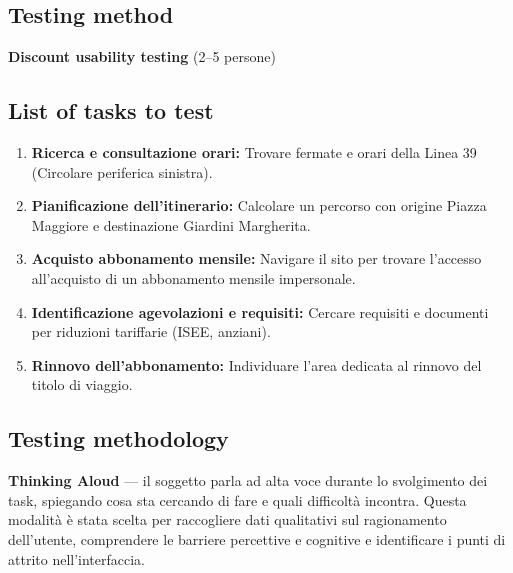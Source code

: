 ﻿\documentclass[11pt,a4paper]{article}
\begin{document}
\vspace{0.2cm}

\subsection*{Testing method}
\textbf{Discount usability testing} (2--5 persone)

\vspace{0.2cm}

\subsection*{List of tasks to test}
\begin{tcolorbox}[base]
\begin{enumerate}[leftmargin=*,itemsep=4pt]
  \item \textbf{Ricerca e consultazione orari:} Trovare fermate e
  orari della Linea 39 (Circolare periferica sinistra).
  \item \textbf{Pianificazione dell'itinerario:} Calcolare un
  percorso con origine Piazza Maggiore e destinazione Giardini
  Margherita.
  \item \textbf{Acquisto abbonamento mensile:} Navigare il sito
  per trovare l'accesso all'acquisto di un abbonamento mensile
  impersonale.
  \item \textbf{Identificazione agevolazioni e requisiti:}
  Cercare requisiti e documenti per riduzioni tariffarie
  (ISEE, anziani).
  \item \textbf{Rinnovo dell'abbonamento:} Individuare l'area
  dedicata al rinnovo del titolo di viaggio.
\end{enumerate}
\end{tcolorbox}

\vspace{0.2cm}

\subsection*{Testing methodology}
\textbf{Thinking Aloud} --- il soggetto parla ad alta voce
durante lo svolgimento dei task, spiegando cosa sta cercando
di fare e quali difficoltà incontra. Questa modalità è stata
scelta per raccogliere dati qualitativi sul ragionamento
dell'utente, comprendere le barriere percettive e cognitive
e identificare i punti di attrito nell'interfaccia.

\vspace{0.2cm}
\end{document}
